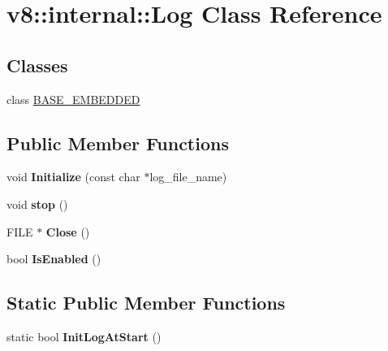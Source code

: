 \hypertarget{classv8_1_1internal_1_1_log}{}\section{v8\+:\+:internal\+:\+:Log Class Reference}
\label{classv8_1_1internal_1_1_log}
\subsection*{Classes}
\begin{DoxyCompactItemize}
\item 
class \hyperlink{classv8_1_1internal_1_1_log_1_1_b_a_s_e___e_m_b_e_d_d_e_d}{B\+A\+S\+E\+\_\+\+E\+M\+B\+E\+D\+D\+E\+D}
\end{DoxyCompactItemize}
\subsection*{Public Member Functions}
\begin{DoxyCompactItemize}
\item 
\hypertarget{classv8_1_1internal_1_1_log_a3df01da984f2e9b9234c88578247dd69}{}void {\bfseries Initialize} (const char $\ast$log\+\_\+file\+\_\+name)\label{classv8_1_1internal_1_1_log_a3df01da984f2e9b9234c88578247dd69}

\item 
\hypertarget{classv8_1_1internal_1_1_log_a495b1e6c4a7b2b77772319711e5006b0}{}void {\bfseries stop} ()\label{classv8_1_1internal_1_1_log_a495b1e6c4a7b2b77772319711e5006b0}

\item 
\hypertarget{classv8_1_1internal_1_1_log_a696f45100002e8105c4d70e8cb5a9cab}{}F\+I\+L\+E $\ast$ {\bfseries Close} ()\label{classv8_1_1internal_1_1_log_a696f45100002e8105c4d70e8cb5a9cab}

\item 
\hypertarget{classv8_1_1internal_1_1_log_a0208fed7368c378edca31079e71bb668}{}bool {\bfseries Is\+Enabled} ()\label{classv8_1_1internal_1_1_log_a0208fed7368c378edca31079e71bb668}

\end{DoxyCompactItemize}
\subsection*{Static Public Member Functions}
\begin{DoxyCompactItemize}
\item 
\hypertarget{classv8_1_1internal_1_1_log_a7dac4222ea501bc24435d3b3b3eddf9b}{}static bool {\bfseries Init\+Log\+At\+Start} ()\label{classv8_1_1internal_1_1_log_a7dac4222ea501bc24435d3b3b3eddf9b}

\end{DoxyCompactItemize}
